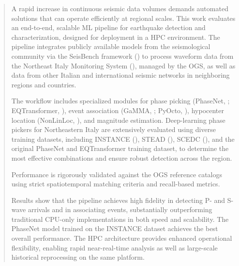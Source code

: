 \begin{abstract}
  A rapid increase in continuous seismic data volumes demands automated
  solutions that can operate efficiently at regional scales. This work
  evaluates an end-to-end, scalable \ac{ML} pipeline for earthquake detection
  and characterization, designed for deployment in a \ac{HPC} environment. The
  pipeline integrates publicly available models from the seismological
  community via the SeisBench framework (\cite{SeisBench}) to process waveform
  data from the Northeast Italy Monitoring System (\cite{SMINO}), managed by
  the \acf{OGS}, as well as data from other Italian and international seismic
  networks in neighboring regions and countries.

  The workflow includes specialized modules for phase picking (PhaseNet,
  \cite{PhaseNet}; EQTransformer, \cite{EQTransformer}), event association
  (GaMMA, \cite{GaMMA}; PyOcto, \cite{PyOcto}), hypocenter location (NonLinLoc,
  \cite{NonLinLoc}), and magnitude estimation. Deep-learning phase pickers for
  Northeastern Italy are extensively evaluated using diverse training datasets,
  including INSTANCE (\cite{INSTANCE}), STEAD (\cite{STEAD}), SCEDC
  (\cite{SCEDC}), and the original PhaseNet and EQTransformer training dataset,
  to determine the most effective combinations and ensure robust detection
  across the region.

  Performance is rigorously validated against the OGS reference catalogs using
  strict spatiotemporal matching criteria and recall-based metrics.

  Results show that the pipeline achieves high fidelity in detecting P- and
  S-wave arrivals and in associating events, substantially outperforming
  traditional CPU-only implementations in both speed and scalability. The
  PhaseNet model trained on the INSTANCE dataset achieves the best overall
  performance. The HPC architecture provides enhanced operational flexibility,
  enabling rapid near-real-time analysis as well as large-scale historical
  reprocessing on the same platform.
\end{abstract}